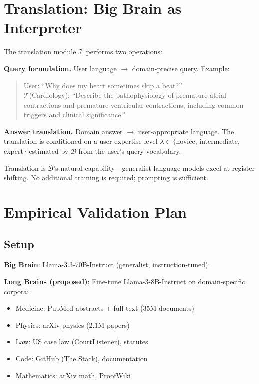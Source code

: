 \documentclass[12pt]{article}
\begin{document}
\section{Translation: Big Brain as Interpreter}
\label{sec:translation}

The translation module $\mathcal{T}$ performs two operations:

\textbf{Query formulation.} User language $\rightarrow$ domain-precise query. Example:

\begin{quote}
User: ``Why does my heart sometimes skip a beat?'' \\
$\mathcal{T}$(Cardiology): ``Describe the pathophysiology of premature atrial contractions and premature ventricular contractions, including common triggers and clinical significance.''
\end{quote}

\textbf{Answer translation.} Domain answer $\rightarrow$ user-appropriate language. The translation is conditioned on a user expertise level $\lambda \in \{$novice, intermediate, expert$\}$ estimated by $\mathcal{B}$ from the user's query vocabulary.

Translation is $\mathcal{B}$'s natural capability---generalist language models excel at register shifting. No additional training is required; prompting is sufficient.

\section{Empirical Validation Plan}
\label{sec:validation}

\subsection{Setup}

\textbf{Big Brain}: Llama-3.3-70B-Instruct (generalist, instruction-tuned).

\textbf{Long Brains (proposed)}: Fine-tune Llama-3-8B-Instruct on domain-specific corpora:
\begin{itemize}
    \item Medicine: PubMed abstracts + full-text (35M documents)
    \item Physics: arXiv physics (2.1M papers)
    \item Law: US case law (CourtListener), statutes
    \item Code: GitHub (The Stack), documentation
    \item Mathematics: arXiv math, ProofWiki
\end{itemize}
\end{document}
